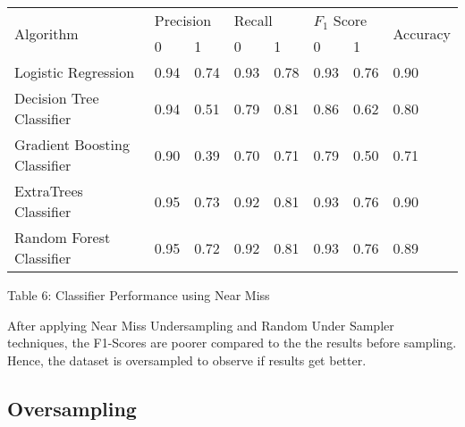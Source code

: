 \documentclass[12pt,letter-paper]{article}
\begin{document}
        \begin{table}[H]
    \begin{center}
        \begin{tabular}{|l|l|l|l|l|l|l|l|}
            \hline
            \multirow{2}{*}{Algorithm} & \multicolumn{2}{l|}{Precision} & \multicolumn{2}{l|}{Recall} & \multicolumn{2}{l|}{$F_1$ Score} & \multirow{2}{*}{Accuracy} \\ \cline{2-7}
                               & 0              & 1             & 0            & 1            & 0             & 1             &                           \\ \hline
        Logistic Regression         & 0.94           & 0.74          & 0.93         & 0.78         & 0.93          & 0.76          & 0.90                     \\ \hline
        Decision Tree Classifier         & 0.94           & 0.51          & 0.79         & 0.81         & 0.86          & 0.62          & 0.80                      \\ \hline
        Gradient Boosting Classifier & 0.90           & 0.39          & 0.70         & 0.71         & 0.79          & 0.50          & 0.71                      \\ \hline
        ExtraTrees Classifier       & 0.95           & 0.73          & 0.92         & 0.81         & 0.93          & 0.76          & 0.90                      \\ \hline
        Random Forest Classifier     & 0.95           & 0.72          & 0.92         & 0.81         & 0.93          & 0.76          & 0.89                      \\ \hline
        \end{tabular}
    \end{center}
    \begin{center}
    Table 6: Classifier Performance using Near Miss 
        \end{center}
        
    After applying Near Miss Undersampling and Random Under Sampler techniques, the F1-Scores are poorer compared to the the results before sampling. Hence, the dataset is oversampled to observe if results get better.
    
    \end{table}
    
    \subsection{Oversampling}
    
\end{document}
